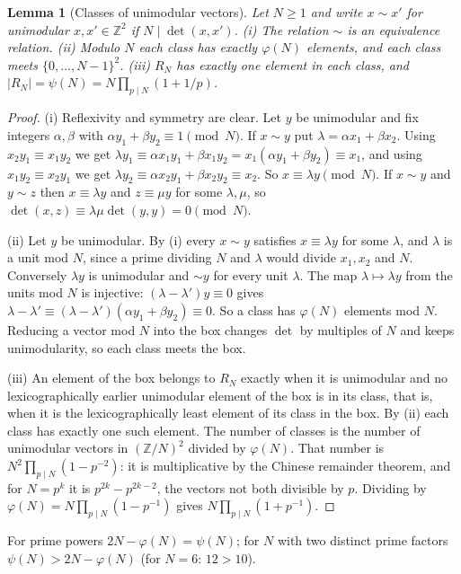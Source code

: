 \documentclass[11pt]{amsart}
\newtheorem{lemma}[theorem]{Lemma}
\theoremstyle{definition}
\theoremstyle{remark}
\newcommand{\Z}{\mathbb{Z}}
\begin{document}
\begin{lemma}[Classes of unimodular vectors]\label{lem:classes}
Let $N\ge1$ and write $x\sim x'$ for unimodular $x,x'\in\Z^2$ if $N\mid\det(x,x')$. (i) The relation $\sim$ is an equivalence relation. (ii) Modulo $N$ each class has exactly $\varphi(N)$ elements, and each class meets $\{0,\dots,N-1\}^2$. (iii) $R_N$ has exactly one element in each class, and $|R_N|=\psi(N)=N\prod_{p\mid N}(1+1/p)$.
\end{lemma}
\begin{proof}
(i) Reflexivity and symmetry are clear. Let $y$ be unimodular and fix integers $\alpha,\beta$ with $\alpha y_1+\beta y_2\equiv1\pmod N$. If $x\sim y$ put $\lambda=\alpha x_1+\beta x_2$. Using $x_2y_1\equiv x_1y_2$ we get $\lambda y_1\equiv\alpha x_1y_1+\beta x_1y_2=x_1(\alpha y_1+\beta y_2)\equiv x_1$, and using $x_1y_2\equiv x_2y_1$ we get $\lambda y_2\equiv\alpha x_2y_1+\beta x_2y_2\equiv x_2$. So $x\equiv\lambda y\pmod N$. If $x\sim y$ and $y\sim z$ then $x\equiv\lambda y$ and $z\equiv\mu y$ for some $\lambda,\mu$, so $\det(x,z)\equiv\lambda\mu\det(y,y)=0\pmod N$.

(ii) Let $y$ be unimodular. By (i) every $x\sim y$ satisfies $x\equiv\lambda y$ for some $\lambda$, and $\lambda$ is a unit mod $N$, since a prime dividing $N$ and $\lambda$ would divide $x_1,x_2$ and $N$. Conversely $\lambda y$ is unimodular and $\sim y$ for every unit $\lambda$. The map $\lambda\mapsto\lambda y$ from the units mod $N$ is injective: $(\lambda-\lambda')y\equiv0$ gives $\lambda-\lambda'\equiv(\lambda-\lambda')(\alpha y_1+\beta y_2)\equiv0$. So a class has $\varphi(N)$ elements mod $N$. Reducing a vector mod $N$ into the box changes $\det$ by multiples of $N$ and keeps unimodularity, so each class meets the box.

(iii) An element of the box belongs to $R_N$ exactly when it is unimodular and no lexicographically earlier unimodular element of the box is in its class, that is, when it is the lexicographically least element of its class in the box. By (ii) each class has exactly one such element. The number of classes is the number of unimodular vectors in $(\Z/N)^2$ divided by $\varphi(N)$. That number is $N^2\prod_{p\mid N}(1-p^{-2})$: it is multiplicative by the Chinese remainder theorem, and for $N=p^k$ it is $p^{2k}-p^{2k-2}$, the vectors not both divisible by $p$. Dividing by $\varphi(N)=N\prod_{p\mid N}(1-p^{-1})$ gives $N\prod_{p\mid N}(1+p^{-1})$.
\end{proof}

For prime powers $2N-\varphi(N)=\psi(N)$; for $N$ with two distinct prime factors $\psi(N)>2N-\varphi(N)$ (for $N=6$: $12>10$).
\end{document}
